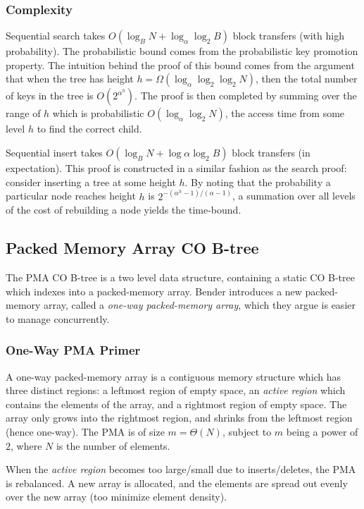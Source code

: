 \documentclass{style}
\begin{document}
\subsubsection{Complexity}
Sequential search takes $O(\log_B{N} + \log_{\alpha}{\log_2{B}})$ block
transfers (with high probability). The probabilistic bound comes from the
probabilistic key promotion property. The intuition behind the proof of this
bound comes from the argument that when the tree has height $h =
\Omega(\log_{\alpha}{\log_2{\log_2{N}}})$, then the total number of keys in the
tree is $O(2^{\alpha^h})$. The proof is then completed by summing over the
range of $h$ which is probabilistic $O(\log_{\alpha}{\log_2{N}})$, the access
time from some level $h$ to find the correct child.

Sequential insert takes $O(\log_B{N} + \log{\alpha}{\log_2{B}})$ block
transfers (in expectation). This proof is constructed in a similar 
fashion as the search proof: consider inserting a tree at some height $h$.
By noting that the probability a particular node reaches height $h$
is $2^{-(\alpha^h-1)/(\alpha-1)}$, a summation over all levels
of the cost of rebuilding a node yields the time-bound.

\subsection{Packed Memory Array CO B-tree}
\label{sec:pma}
The PMA CO B-tree is a two level data structure, containing a static
CO B-tree which indexes into a packed-memory array. Bender introduces
a new packed-memory array, called a \textit{one-way packed-memory array},
which they argue is easier to manage concurrently.

\subsubsection{One-Way PMA Primer}

A one-way packed-memory array is a contiguous memory structure which has three
distinct regions: a leftmost region of empty space, an \textit{active region}
which contains the elements of the array, and a rightmost region of empty
space. The array only grows into the rightmost region, and shrinks from the
leftmost region (hence one-way).  The PMA is of size $m = \Theta(N)$, subject
to $m$ being a power of $2$, where $N$ is the number of elements.

When the \textit{active region} becomes too large/small due to inserts/deletes,
the PMA is rebalanced. A new array is allocated, and the elements are
spread out evenly over the new array (too minimize element density).
\end{document}
